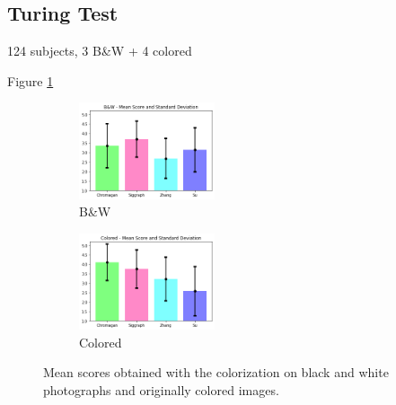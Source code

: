 \subsection{Turing Test}
124 subjects, 3 B\&W + 4 colored

Figure \ref{fig:turing}
\begin{figure}[h]
	\centering
	\captionsetup[subfigure]{labelformat=empty}
	\begin{subfigure}[b]{0.1\textwidth}
		\begin{adjustwidth}{-1.1cm}{}
		\includegraphics[width=4cm]{bw turing.png}
		\end{adjustwidth}
	\caption{B\&W}
	\end{subfigure}
\hspace{2.3cm}
	\begin{subfigure}[b]{0.1\textwidth}
		\begin{adjustwidth}{-1.1cm}{}
			\includegraphics[width=4cm]{col turing.png}
		\end{adjustwidth}
		\caption{Colored}
	\end{subfigure}
	\caption{{\small Mean scores obtained with the colorization on black and white photographs and originally colored images.}}
	\label{fig:turing}
\end{figure}